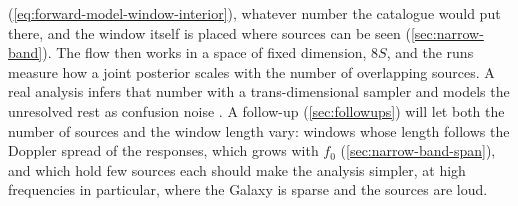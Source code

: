 (\cref{eq:forward-model-window-interior}), whatever number the catalogue would put there, and the
window itself is placed where sources can be seen (\cref{sec:narrow-band}). The
flow then works in a space of fixed dimension, $8S$, and the runs measure how a joint posterior
scales with the number of overlapping sources. A real analysis infers that number with a
trans-dimensional sampler \citep{littenberg2020global} and models the unresolved rest as confusion
noise \citep{karnesis2021characterization}. A follow-up (\cref{sec:followups}) will let both the
number of sources and the window length vary: windows whose length follows the Doppler spread of the
responses, which grows with $f_0$ (\cref{sec:narrow-band-span}), and which hold few sources each should make the analysis simpler,
at high frequencies in particular, where the Galaxy is sparse and the sources are loud.
